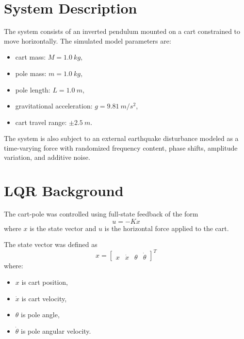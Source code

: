 \documentclass[11pt]{article}
\begin{document}
\newpage
\section{System Description}
The system consists of an inverted pendulum mounted on a cart constrained to move horizontally. The simulated model parameters are:
\begin{itemize}[itemsep=2pt]
    \item cart mass: $M = \SI{1.0}{kg}$,
    \item pole mass: $m = \SI{1.0}{kg}$,
    \item pole length: $L = \SI{1.0}{m}$,
    \item gravitational acceleration: $g = \SI{9.81}{m/s^2}$,
    \item cart travel range: $\pm \SI{2.5}{m}$.
\end{itemize}

The system is also subject to an external earthquake disturbance modeled as a time-varying force with randomized frequency content, phase shifts, amplitude variation, and additive noise.

\section{LQR Background}
The cart-pole was controlled using full-state feedback of the form
\begin{equation}
    u = -Kx
\end{equation}
where $x$ is the state vector and $u$ is the horizontal force applied to the cart.

The state vector was defined as
\begin{equation}
    x =
    \begin{bmatrix}
        x & \dot{x} & \theta & \dot{\theta}
    \end{bmatrix}^{T}
\end{equation}
where:
\begin{itemize}[itemsep=2pt]
    \item $x$ is cart position,
    \item $\dot{x}$ is cart velocity,
    \item $\theta$ is pole angle,
    \item $\dot{\theta}$ is pole angular velocity.
\end{itemize}
\end{document}
